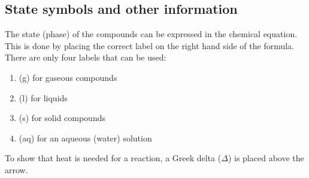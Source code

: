             \subsection{ State symbols and other information}
            \nopagebreak
      \label{m38727*id65920}The state (phase) of the compounds can be expressed in the chemical equation. This is done by placing the correct label on the right hand side of the formula. There are only four labels that can be used:\par 
      \label{m38727*id65925}\begin{enumerate}[noitemsep, label=\textbf{\arabic*}. ] 
            \label{m38727*uid27}\item (g) for gaseous compounds
\label{m38727*uid28}\item (l) for liquids
\label{m38727*uid29}\item (s) for solid compounds
\label{m38727*uid30}\item (aq) for an aqueous (water) solution
\end{enumerate}
\label{m38727*eip-536}To show that heat is needed for a reaction, a Greek delta ($\Delta $) is placed above the arrow.\par \label{m38727*notfhsst!!!underscore!!!id966}
	\par
\label{m38727*secfhsst!!!underscore!!!id967}\vspace{.5cm} 
      \noindent

